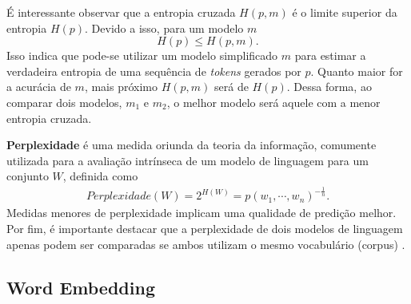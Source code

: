 \documentclass{automatextcc}
\begin{document}
É interessante observar que a entropia cruzada $H(p,m)$ é o limite superior da entropia $H(p)$. Devido a isso, para um modelo $m$
\begin{equation}
    H(p) \leq H(p,m).
\end{equation}
Isso indica que pode-se utilizar um modelo simplificado $m$ para estimar a verdadeira entropia de uma sequência de \textit{tokens} gerados por $p$. Quanto maior for a acurácia de $m$, mais próximo $H(p,m)$ será de $H(p)$. Dessa forma, ao comparar dois modelos, $m_1$ e $m_2$, o melhor modelo será aquele com a menor entropia cruzada.

\textbf{Perplexidade} é uma medida oriunda da teoria da informação, comumente utilizada para a avaliação intrínseca de um modelo de linguagem para um conjunto $W$, definida como
\begin{align*}
    Perplexidade(W)  = 2^{H(W)}  = p(w_1,\cdots,w_n)^{-\frac{1}{n}}.
\end{align*}
Medidas menores de perplexidade implicam uma qualidade de predição melhor. Por fim, é importante destacar que a perplexidade de dois modelos de linguagem apenas podem ser comparadas se ambos utilizam o mesmo vocabulário (corpus) \citep{manning1999, kamath2019, jurafsky2021}.







\subsection{Word Embedding}
\end{document}
